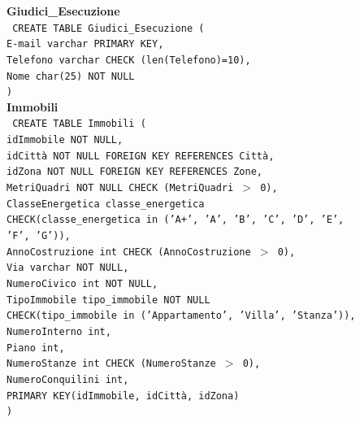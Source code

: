 \documentclass[a4paper,12pt]{report}
\begin{document}
                \noindent
                {\large \textbf{Giudici\_Esecuzione}} \\
                \texttt{
                    CREATE TABLE Giudici\_Esecuzione ( \\
                    \null\quad\quad E-mail      varchar     PRIMARY KEY, \\
                    \null\quad\quad Telefono    varchar     CHECK (len(Telefono)=10), \\
                    \null\quad\quad Nome        char(25)    NOT NULL \\
                    )
                } \\

                \noindent
                {\large \textbf{Immobili}} \\
                \texttt{
                    CREATE TABLE Immobili ( \\
                    \null\quad\quad idImmobile           NOT NULL, \\
                    \null\quad\quad idCittà              NOT NULL               FOREIGN KEY REFERENCES Città, \\
                    \null\quad\quad idZona               NOT NULL               FOREIGN KEY REFERENCES Zone, \\
                    \null\quad\quad MetriQuadri          NOT NULL               CHECK (MetriQuadri $>$ 0), \\
                    \null\quad\quad ClasseEnergetica     classe\_energetica \\
                            \null\qquad\qquad CHECK(classe\_energetica in ('A+', 'A', 'B', 'C', 'D', 'E', \\
                            \null\qquad\qquad 'F', 'G')), \\
                    \null\quad\quad AnnoCostruzione      int                    CHECK (AnnoCostruzione $>$ 0), \\
                    \null\quad\quad Via                  varchar                NOT NULL, \\
                    \null\quad\quad NumeroCivico         int                    NOT NULL, \\
                    \null\quad\quad TipoImmobile         tipo\_immobile         NOT NULL \\
                            \null\qquad\qquad CHECK(tipo\_immobile in ('Appartamento', 'Villa', 'Stanza')), \\
                    \null\quad\quad NumeroInterno        int, \\
                    \null\quad\quad Piano                int, \\
                    \null\quad\quad NumeroStanze         int                    CHECK (NumeroStanze $>$ 0), \\
                    \null\quad\quad NumeroConquilini     int, \\
                    \null\quad\quad PRIMARY KEY(idImmobile, idCittà, idZona) \\
                    )
                } \\
\end{document}
